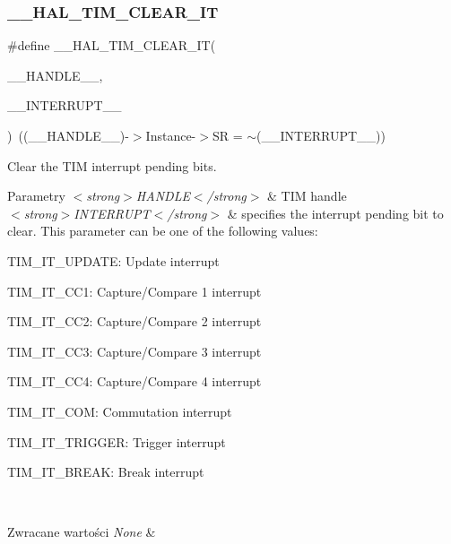 \subsubsection{\texorpdfstring{\+\_\+\+\_\+\+H\+A\+L\+\_\+\+T\+I\+M\+\_\+\+C\+L\+E\+A\+R\+\_\+\+IT}{\_\_HAL\_TIM\_CLEAR\_IT}}
{\footnotesize\ttfamily \#define \+\_\+\+\_\+\+H\+A\+L\+\_\+\+T\+I\+M\+\_\+\+C\+L\+E\+A\+R\+\_\+\+IT(\begin{DoxyParamCaption}\item[{}]{\+\_\+\+\_\+\+H\+A\+N\+D\+L\+E\+\_\+\+\_\+,  }\item[{}]{\+\_\+\+\_\+\+I\+N\+T\+E\+R\+R\+U\+P\+T\+\_\+\+\_\+ }\end{DoxyParamCaption})~((\+\_\+\+\_\+\+H\+A\+N\+D\+L\+E\+\_\+\+\_\+)-\/$>$Instance-\/$>$SR = $\sim$(\+\_\+\+\_\+\+I\+N\+T\+E\+R\+R\+U\+P\+T\+\_\+\+\_\+))}



Clear the T\+IM interrupt pending bits. 


\begin{DoxyParams}{Parametry}
{\em $<$strong$>$\+H\+A\+N\+D\+L\+E$<$/strong$>$} & T\+IM handle \\
\hline
{\em $<$strong$>$\+I\+N\+T\+E\+R\+R\+U\+P\+T$<$/strong$>$} & specifies the interrupt pending bit to clear. This parameter can be one of the following values\+: \begin{DoxyItemize}
\item T\+I\+M\+\_\+\+I\+T\+\_\+\+U\+P\+D\+A\+TE\+: Update interrupt \item T\+I\+M\+\_\+\+I\+T\+\_\+\+C\+C1\+: Capture/\+Compare 1 interrupt \item T\+I\+M\+\_\+\+I\+T\+\_\+\+C\+C2\+: Capture/\+Compare 2 interrupt \item T\+I\+M\+\_\+\+I\+T\+\_\+\+C\+C3\+: Capture/\+Compare 3 interrupt \item T\+I\+M\+\_\+\+I\+T\+\_\+\+C\+C4\+: Capture/\+Compare 4 interrupt \item T\+I\+M\+\_\+\+I\+T\+\_\+\+C\+OM\+: Commutation interrupt \item T\+I\+M\+\_\+\+I\+T\+\_\+\+T\+R\+I\+G\+G\+ER\+: Trigger interrupt \item T\+I\+M\+\_\+\+I\+T\+\_\+\+B\+R\+E\+AK\+: Break interrupt \end{DoxyItemize}
\\
\hline
\end{DoxyParams}

\begin{DoxyRetVals}{Zwracane wartości}
{\em None} & \\
\hline
\end{DoxyRetVals}


